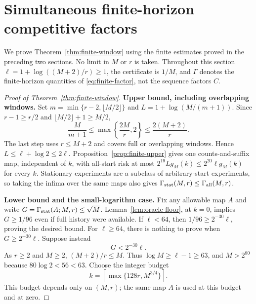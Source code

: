\section{Simultaneous finite-horizon competitive factors}
\label{sec:finite-window-proof}

We prove Theorem~\ref{thm:finite-window} using the finite estimates proved
in the preceding two sections. No limit in $M$ or $r$ is taken. Throughout
this section $\ell=1+\log((M+2)/r)\ge1$, the certificate is $1/M$, and
$\Gamma$ denotes the finite-horizon quantities of
\eqref{eq:finite-factor}, not the sequence factors $C$.

\begin{proof}[Proof of Theorem~\ref{thm:finite-window}]
\noindent\textbf{Upper bound, including overlapping windows.}
Set $m=\min\{r-2,\lfloor M/2\rfloor\}$ and
$L=1+\log(M/(m+1))$. Since $r-1\ge r/2$ and
$\lfloor M/2\rfloor+1\ge M/2$,
\[
 \frac{M}{m+1}
 \le\max\left\{\frac{2M}{r},2\right\}
 \le\frac{2(M+2)}r.
\]
The last step uses $r\le M+2$ and covers full or overlapping windows.
Hence $L\le\ell+\log2\le2\ell$. Proposition~\ref{prop:finite-upper}
gives one counts-and-suffix map, independent of $k$, with all-start risk
at most $2^{19}Lg_M(k)\le2^{20}\ell g_M(k)$ for every $k$.
Stationary experiments are a subclass of arbitrary-start experiments,
so taking the infima over the same maps also gives
$\Gamma_{\rm stat}(M,r)\le\Gamma_{\rm all}(M,r)$.

\noindent\textbf{Lower bound and the small-logarithm case.}
Fix any allowable map $A$ and write
$G=\Gamma_{\rm stat}(A;M,r)\le\sqrt M$.
Lemma~\ref{lem:oracle-floor}, at $k=0$, implies $G\ge1/96$ even if
full history were available. If $\ell<64$, then
$1/96\ge2^{-30}\ell$, proving the desired bound. For $\ell\ge64$,
there is nothing to prove when $G\ge2^{-30}\ell$. Suppose instead
\begin{equation}\label{eq:fh-contradiction}
 G<2^{-30}\ell.
\end{equation}
As $r\ge2$ and $M\ge2$, $(M+2)/r\le M$. Thus
$\log M\ge\ell-1\ge63$, and $M>2^{80}$ because $80\log2<56<63$.
Choose the integer budget
\begin{equation}\label{eq:fh-budget}
 k=\left\lceil\max\{128r,M^{3/4}\}\right\rceil.
\end{equation}
This budget depends only on $(M,r)$; the same map $A$ is used at this
budget and at zero.


\end{proof}
